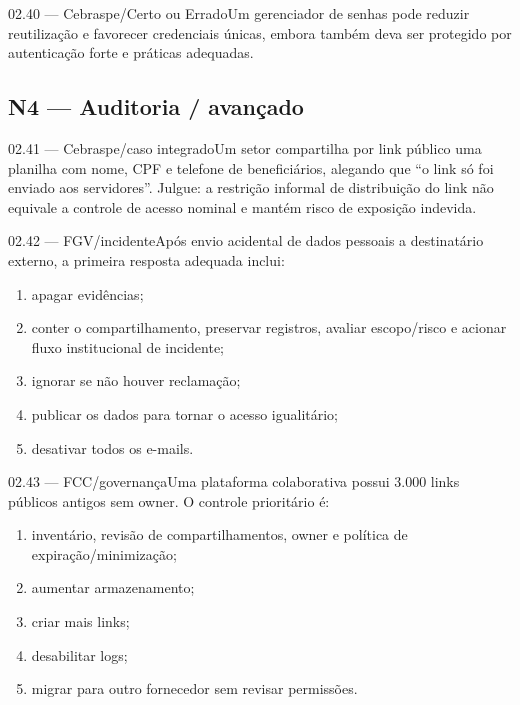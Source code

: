\begin{questao}{ 02.40 — Cebraspe/Certo ou Errado}Um gerenciador de senhas pode reduzir reutilização e favorecer credenciais únicas, embora também deva ser protegido por autenticação forte e práticas adequadas.\end{questao}

\subsection*{N4 — Auditoria / avançado}
\begin{questao}{ 02.41 — Cebraspe/caso integrado}Um setor compartilha por link público uma planilha com nome, CPF e telefone de beneficiários, alegando que ``o link só foi enviado aos servidores''. Julgue: a restrição informal de distribuição do link não equivale a controle de acesso nominal e mantém risco de exposição indevida.\end{questao}
\begin{questao}{ 02.42 — FGV/incidente}Após envio acidental de dados pessoais a destinatário externo, a primeira resposta adequada inclui:\begin{enumerate}[label=\Alph*)]\item apagar evidências;\item conter o compartilhamento, preservar registros, avaliar escopo/risco e acionar fluxo institucional de incidente;\item ignorar se não houver reclamação;\item publicar os dados para tornar o acesso igualitário;\item desativar todos os e-mails.\end{enumerate}\end{questao}
\begin{questao}{ 02.43 — FCC/governança}Uma plataforma colaborativa possui 3.000 links públicos antigos sem owner. O controle prioritário é:\begin{enumerate}[label=\Alph*)]\item inventário, revisão de compartilhamentos, owner e política de expiração/minimização;\item aumentar armazenamento;\item criar mais links;\item desabilitar logs;\item migrar para outro fornecedor sem revisar permissões.\end{enumerate}\end{questao}
